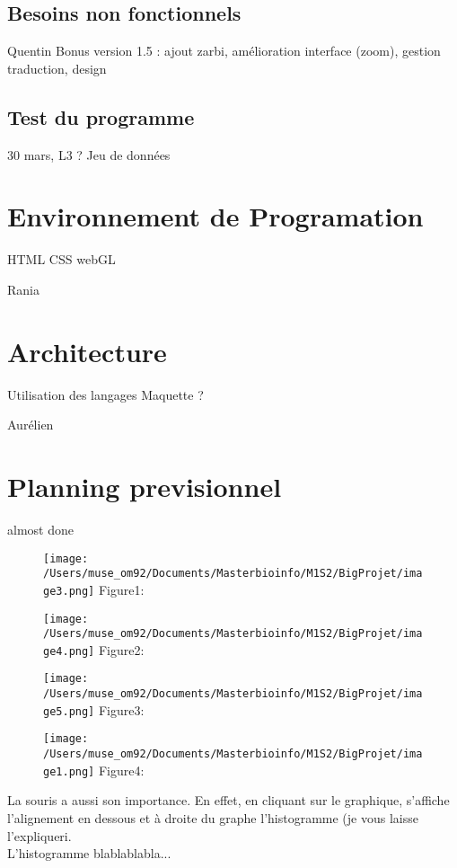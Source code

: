 \documentclass{report}
\begin{document}
\section{Besoins non fonctionnels}
Quentin
Bonus
version 1.5 : ajout zarbi, amélioration interface (zoom), gestion traduction, design

\section{Test du programme}

30 mars, L3 ?
Jeu de données

\chapter{Environnement de Programation}
HTML
CSS
webGL

Rania

\chapter{Architecture}
Utilisation des langages
Maquette ?

Aurélien


\chapter{Planning previsionnel}
almost done

\begin{figure}[!h]
\centering
\texttt{[image: /Users/muse\_om92/Documents/Masterbioinfo/M1S2/BigProjet/image3.png]}
Figure1: 
\end{figure}
\begin{figure}[!h]
\centering
\texttt{[image: /Users/muse\_om92/Documents/Masterbioinfo/M1S2/BigProjet/image4.png]}
Figure2:
\end{figure}
\begin{figure}[!h]
\centering
\texttt{[image: /Users/muse\_om92/Documents/Masterbioinfo/M1S2/BigProjet/image5.png]}
Figure3:
\end{figure}
\begin{figure}[!h]
\centering
\texttt{[image: /Users/muse\_om92/Documents/Masterbioinfo/M1S2/BigProjet/image1.png]}
Figure4:
\end{figure}

La souris a aussi son importance. En effet, en cliquant sur le graphique, s'affiche l'alignement en dessous et à droite du graphe l'histogramme (je vous laisse l'expliquer^^).\\
L'histogramme blablablabla...
\end{document}

